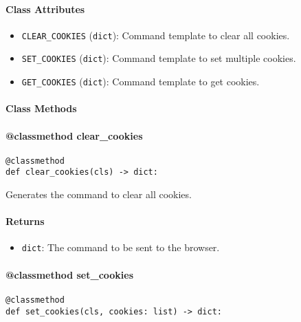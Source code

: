 \documentclass{article}
\begin{document}
\paragraph{Class Attributes}

\begin{itemize}
    \item \lstinline[style=pythonstyle]|CLEAR_COOKIES| (\lstinline[style=pythonstyle]|dict|): Command template to clear all cookies.
    \item \lstinline[style=pythonstyle]|SET_COOKIES| (\lstinline[style=pythonstyle]|dict|): Command template to set multiple cookies.
    \item \lstinline[style=pythonstyle]|GET_COOKIES| (\lstinline[style=pythonstyle]|dict|): Command template to get cookies.
\end{itemize}

\paragraph{Class Methods}
\paragraph{@classmethod clear\_cookies}

\begin{lstlisting}[style=pythonstyle]
@classmethod
def clear_cookies(cls) -> dict:
\end{lstlisting}

\noindent Generates the command to clear all cookies.

\paragraph{Returns}

\begin{itemize}
    \item \lstinline[style=pythonstyle]|dict|: The command to be sent to the browser.
\end{itemize}

\paragraph{@classmethod set\_cookies}

\begin{lstlisting}[style=pythonstyle]
@classmethod
def set_cookies(cls, cookies: list) -> dict:
\end{lstlisting}
\end{document}

